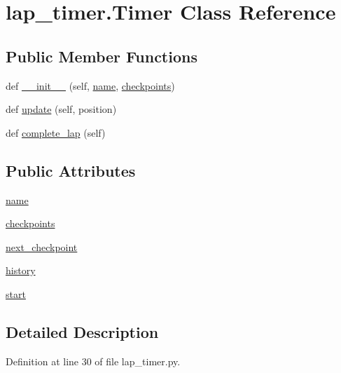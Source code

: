 \hypertarget{classlap__timer_1_1_timer}{}\section{lap\+\_\+timer.\+Timer Class Reference}
\label{classlap__timer_1_1_timer}
\subsection*{Public Member Functions}
\begin{DoxyCompactItemize}
\item 
def \hyperlink{classlap__timer_1_1_timer_a3bdbd67e2beaf8082a73eb6833b39e0c}{\+\_\+\+\_\+init\+\_\+\+\_\+} (self, \hyperlink{classlap__timer_1_1_timer_a6fc67417278276bc1bd71aca1686107c}{name}, \hyperlink{classlap__timer_1_1_timer_a497cd7a079955a13b7722de46a841133}{checkpoints})
\item 
def \hyperlink{classlap__timer_1_1_timer_a0bed2d0b2adbe659360625983e0c6875}{update} (self, position)
\item 
def \hyperlink{classlap__timer_1_1_timer_a92500d76bee13b511faef4d16c875baf}{complete\+\_\+lap} (self)
\end{DoxyCompactItemize}
\subsection*{Public Attributes}
\begin{DoxyCompactItemize}
\item 
\hyperlink{classlap__timer_1_1_timer_a6fc67417278276bc1bd71aca1686107c}{name}
\item 
\hyperlink{classlap__timer_1_1_timer_a497cd7a079955a13b7722de46a841133}{checkpoints}
\item 
\hyperlink{classlap__timer_1_1_timer_a14f57c27d32e7e7591b38708c68a9e98}{next\+\_\+checkpoint}
\item 
\hyperlink{classlap__timer_1_1_timer_a7068a3c73d3386620181bbaee0a56604}{history}
\item 
\hyperlink{classlap__timer_1_1_timer_a3543c782f954f47c01b2068674bfe96b}{start}
\end{DoxyCompactItemize}


\subsection{Detailed Description}


Definition at line 30 of file lap\+\_\+timer.\+py.



